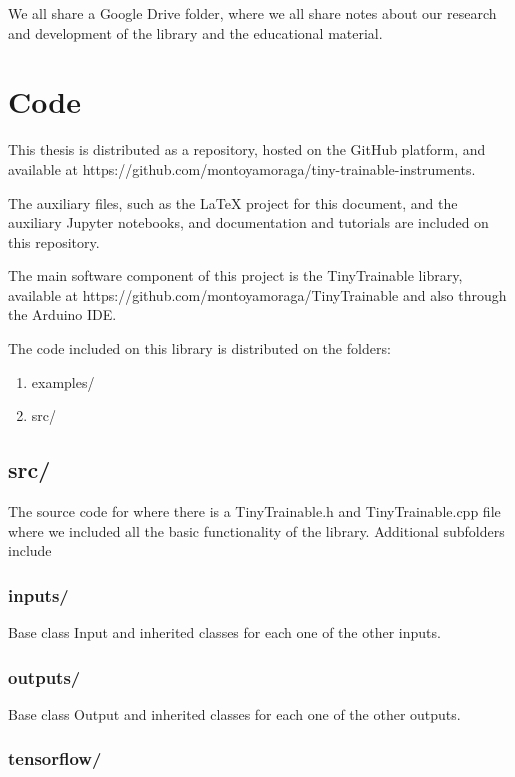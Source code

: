 We all share a Google Drive folder, where we all share notes about our research and development of the library and the educational material.

\section{Code}

This thesis is distributed as a repository, hosted on the GitHub platform, and available at https://github.com/montoyamoraga/tiny-trainable-instruments.

The auxiliary files, such as the LaTeX project for this document, and the auxiliary Jupyter notebooks, and documentation and tutorials are included on this repository.

The main software component of this project is the TinyTrainable library, available at https://github.com/montoyamoraga/TinyTrainable and also through the Arduino IDE.

The code included on this library is distributed on the folders:

\begin{enumerate}
  \item examples/
  \item src/
\end{enumerate}

\subsection{src/}

The source code for where there is a TinyTrainable.h and TinyTrainable.cpp file where we included all the basic functionality of the library. Additional subfolders include

\subsubsection{inputs/}

Base class Input and inherited classes for each one of the other inputs.

\subsubsection{outputs/}

Base class Output and inherited classes for each one of the other outputs.

\subsubsection{tensorflow/}

